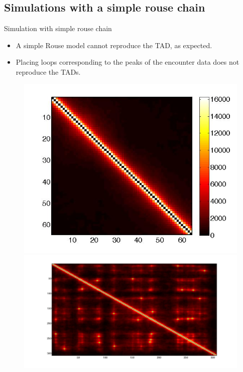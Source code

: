 \documentclass[8pt]{beamer}
\begin{document}
\subsection{Simulations with a simple rouse chain}
\begin{frame}{Simulation with simple rouse chain}
\begin{itemize}
\item A simple Rouse model cannot reproduce the TAD, as expected.
\item Placing loops corresponding to the peaks of the encounter data does not reproduce the TADs. 
\end{itemize}
\begin{figure}[H]
\includegraphics[scale=0.17]{encounterMatrix64Beads}
\includegraphics[scale=0.09]{meanEncounterMatrixOfSimulatingTADEandDWithLoops}
\end{figure}
\end{frame}
\end{document}
